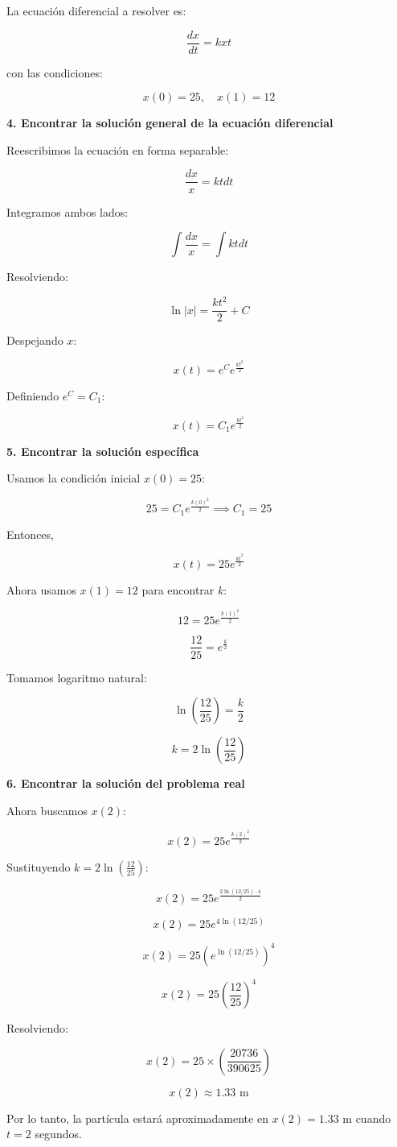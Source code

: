 \documentclass[answers]{exam}
\begin{document}
La ecuación diferencial a resolver es:

\[
	\frac{dx}{dt} = k x t
\]

con las condiciones:

\[
	x(0) = 25, \quad x(1) = 12
\]

\vspace{0.3cm}
\textbf{4. Encontrar la solución general de la ecuación diferencial}

Reescribimos la ecuación en forma separable:

\[
	\frac{dx}{x} = k t dt
\]

Integramos ambos lados:

\[
	\int \frac{dx}{x} = \int k t dt
\]

Resolviendo:

\[
	\ln |x| = \frac{k t^2}{2} + C
\]

Despejando \( x \):

\[
	x(t) = e^{C} e^{\frac{k t^2}{2}}
\]

Definiendo \( e^C = C_1 \):

\[
	x(t) = C_1 e^{\frac{k t^2}{2}}
\]

\newpage
\textbf{5. Encontrar la solución específica}

Usamos la condición inicial \( x(0) = 25 \):

\[
	25 = C_1 e^{\frac{k(0)^2}{2}}
	\implies
	C_1 = 25
\]

Entonces,

\[
	x(t) = 25 e^{\frac{k t^2}{2}}
\]

Ahora usamos \( x(1) = 12 \) para encontrar \( k \):

\[
	12 = 25 e^{\frac{k (1)^2}{2}}
\]

\[
	\frac{12}{25} = e^{\frac{k}{2}}
\]

Tomamos logaritmo natural:

\[
	\ln \left(\frac{12}{25} \right) = \frac{k}{2}
\]

\[
	k = 2 \ln \left(\frac{12}{25} \right)
\]

\vspace{0.3cm}
\textbf{6. Encontrar la solución del problema real}

Ahora buscamos \( x(2) \):

\[
	x(2) = 25 e^{\frac{k(2)^2}{2}}
\]

Sustituyendo \( k = 2 \ln \left(\frac{12}{25} \right) \):

\[
	x(2) = 25 e^{\frac{2 \ln(12/25) \cdot 4}{2}}
\]

\[
	x(2) = 25 e^{4 \ln(12/25)}
\]

\[
	x(2) = 25 \left( e^{\ln(12/25)} \right)^4
\]

\[
	x(2) = 25 \left(\frac{12}{25} \right)^4
\]

Resolviendo:

\[
	x(2) = 25 \times \left(\frac{20736}{390625} \right)
\]

\[
	x(2) \approx 1.33 \text{ m}
\]

Por lo tanto, la partícula estará aproximadamente en \( x(2) = 1.33 \) m cuando \( t = 2 \) segundos.
\end{document}

